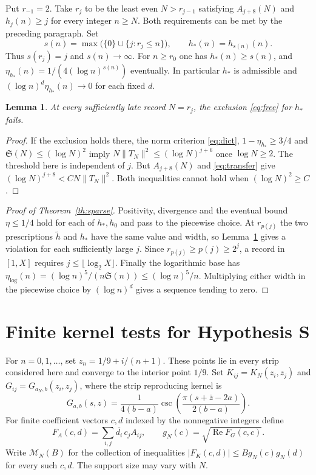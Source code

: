 \documentclass[11pt,a4paper]{article}
\newtheorem{lemma}[theorem]{Lemma}
\newcommand{\SSg}{\mathfrak S}
\DeclareMathOperator{\Rea}{Re}
\begin{document}
Put $r_{-1}=2$. Take $r_j$ to be the least even $N>r_{j-1}$ satisfying $A_{j+8}(N)$ and $h_j(n)\ge j$ for every integer $n\ge N$. Both requirements can be met by the preceding paragraph. Set
\[
 s(n)=\max\bigl(\{0\}\cup\{j:r_j\le n\}\bigr),\qquad h_*(n)=h_{s(n)}(n).
\]
Thus $s(r_j)=j$ and $s(n)\to\infty$. For $n\ge r_0$ one has $h_*(n)\ge s(n)$, and $\eta_{h_*}(n)=1/(4(\log n)^{s(n)})$ eventually. In particular $h_*$ is admissible and $(\log n)^d\eta_{h_*}(n)\to0$ for each fixed $d$.

\begin{lemma}\label{lm:records}
At every sufficiently late record $N=r_j$, the exclusion \eqref{eq:free} for $h_*$ fails.
\end{lemma}
\begin{proof}
If the exclusion holds there, the norm criterion \eqref{eq:dict}, $1-\eta_{h_*}\ge3/4$ and $\SSg(N)\le(\log N)^2$ imply $N\|T_N\|^2\le(\log N)^{j+6}$ once $\log N\ge2$. The threshold here is independent of $j$. But $A_{j+8}(N)$ and \eqref{eq:transfer} give $(\log N)^{j+8}<C N\|T_N\|^2$. Both inequalities cannot hold when $(\log N)^2\ge C$.
\end{proof}

\begin{proof}[Proof of Theorem~\ref{th:sparse}]
Positivity, divergence and the eventual bound $\eta\le1/4$ hold for each of $h_*,h_0$ and pass to the piecewise choice. At $r_{p(j)}$ the two prescriptions $\widetilde h$ and $h_*$ have the same value and width, so Lemma~\ref{lm:records} gives a violation for each sufficiently large $j$. Since $r_{p(j)}\ge p(j)\ge2^j$, a record in $[1,X]$ requires $j\le\lfloor\log_2 X\rfloor$. Finally the logarithmic base has $\eta_{\log}(n)=(\log n)^5/(n\SSg(n))\le(\log n)^5/n$. Multiplying either width in the piecewise choice by $(\log n)^d$ gives a sequence tending to zero.
\end{proof}

\section{Finite kernel tests for Hypothesis S}\label{sec:samples}

For $n=0,1,\ldots$, set $z_n=1/9+i/(n+1)$. These points lie in every strip considered here and converge to the interior point $1/9$. Set $K_{ij}=K_N(z_i,z_j)$ and $G_{ij}=G_{a_N,b}(z_i,z_j)$, where the strip reproducing kernel is
\[
 G_{a,b}(s,z)=\frac{1}{4(b-a)}
     \csc\!\left(\frac{\pi(s+\bar z-2a)}{2(b-a)}\right).
\]
For finite coefficient vectors $c,d$ indexed by the nonnegative integers define
\[
 F_A(c,d)=\sum_{i,j}\overline{d_i}\,c_j A_{ij},
 \qquad g_N(c)=\sqrt{\Rea F_G(c,c)} .
\]
Write $\mathcal M_N(B)$ for the collection of inequalities
$|F_K(c,d)|\le B g_N(c)g_N(d)$ for every such $c,d$. The support size may vary with $N$.
\end{document}

